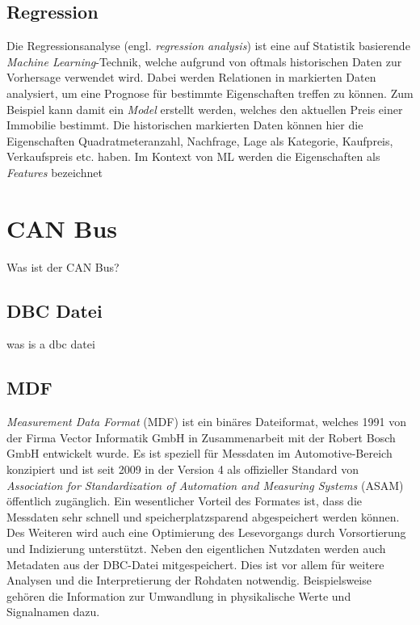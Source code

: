 \subsection{Regression}
\label{sec:ml_regression}

Die Regressionsanalyse (engl. \textit{regression analysis}) ist eine auf Statistik basierende \textit{Machine Learning}-Technik, welche aufgrund von oftmals historischen Daten zur Vorhersage verwendet wird. Dabei werden Relationen in markierten Daten analysiert, um eine Prognose für bestimmte Eigenschaften treffen zu können. Zum Beispiel kann damit ein \textit{Model} erstellt werden, welches den aktuellen Preis einer Immobilie bestimmt. Die historischen markierten Daten können hier die Eigenschaften Quadratmeteranzahl, Nachfrage, Lage als Kategorie, Kaufpreis, Verkaufspreis etc. haben. Im Kontext von ML werden die Eigenschaften als \textit{Features} bezeichnet

\section{CAN Bus}
\label{sec:can_bus}

Was ist der CAN Bus?

\subsection{DBC Datei}

was is a dbc datei

\subsection{MDF}

\textit{Measurement Data Format} (MDF) ist ein binäres Dateiformat, welches 1991 von der Firma Vector Informatik GmbH in Zusammenarbeit mit der Robert Bosch GmbH entwickelt wurde. Es ist speziell für Messdaten im Automotive-Bereich konzipiert und ist seit 2009 in der Version 4 als offizieller Standard von \textit{Association for Standardization of Automation and Measuring Systems} (ASAM) öffentlich zugänglich. Ein wesentlicher Vorteil des Formates ist, dass die Messdaten sehr schnell und speicherplatzsparend abgespeichert werden können. Des Weiteren wird auch eine Optimierung des Lesevorgangs durch Vorsortierung und Indizierung unterstützt. Neben den eigentlichen Nutzdaten werden auch Metadaten aus der DBC-Datei mitgespeichert. Dies ist vor allem für weitere Analysen und die Interpretierung der Rohdaten notwendig. Beispielsweise gehören die Information zur Umwandlung in physikalische Werte und Signalnamen dazu. \cite{ASAM14}

